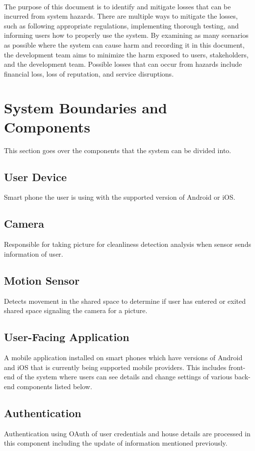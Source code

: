 \documentclass{article}
\begin{document}
\\
The purpose of this document is to identify and mitigate losses that can be incurred from system hazards. There are multiple ways to mitigate the losses, such as following appropriate regulations, implementing thorough testing, and informing users how to properly use the system. By examining as many scenarios as possible where the system can cause harm and recording it in this document, the development team aims to minimize the harm exposed to users, stakeholders, and the development team. Possible losses that can occur from hazards include financial loss, loss of reputation, and service disruptions.      

\section{System Boundaries and Components}
This section goes over the components that the system can be divided into.

\subsection{User Device}
Smart phone the user is using with the supported version of Android or iOS.

\subsection{Camera}
Responsible for taking picture for cleanliness detection analysis when sensor sends information of user.

\subsection{Motion Sensor}
Detects movement in the shared space to determine if user has entered or exited shared space signaling the camera for a picture.

\subsection{User-Facing Application}
A mobile application installed on smart phones which have versions of Android and iOS that is currently being supported mobile providers. This includes front-end of the system where users can see details and change settings of various back-end components listed below.

\subsection{Authentication}
Authentication using OAuth of user credentials and house details are processed in this component including the update of information mentioned previously.
\end{document}
